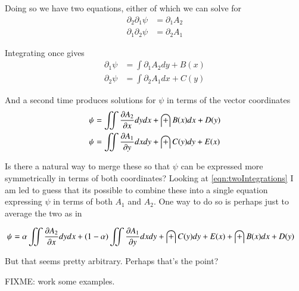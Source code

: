 \documentclass{article}
\begin{document}
Doing so we have two equations, either of which we can solve for
\begin{align*}
\partial_2 \partial_1 \psi &= \partial_1 A_2 \\
\partial_1 \partial_2 \psi &= \partial_2 A_1 
\end{align*}

Integrating once gives
\begin{align*}
\partial_1 \psi &= \int \partial_1 A_2 dy + B(x) \\
\partial_2 \psi &= \int \partial_2 A_1 dx + C(y)
\end{align*}

And a second time produces solutions for $\psi$ in terms of the vector coordinates
\begin{align}\label{eqn:twoIntegrations}
\psi &= \iint \PD{x}{A_2} dy dx + \int B(x) dx + D(y) \\
\psi &= \iint \PD{y}{A_1} dx dy + \int C(y) dy + E(x)
\end{align}

Is there a natural way to merge these so that $\psi$ can be expressed more symmetrically in terms of both coordinates?  
Looking at \ref{eqn:twoIntegrations} I am led to guess that its possible to 
combine these into a single equation expressing $\psi$ in terms of both $A_1$ and $A_2$.  One way to do so is perhaps just to average the
two as in

\begin{align*}
\psi &= \alpha \iint \PD{x}{A_2} dy dx + (1-\alpha) \iint \PD{y}{A_1} dx dy + \int C(y) dy + E(x) + \int B(x) dx + D(y) 
\end{align*}

But that seems pretty arbitrary.  Perhaps that's the point?

FIXME: work some examples.



%
%
%
\end{document}
